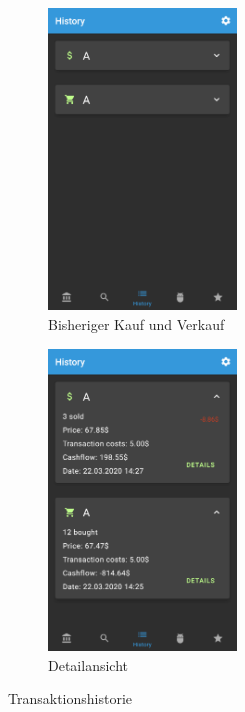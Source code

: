 \documentclass[a4paper]{article}
\begin{document}
\begin{figure}[H]
	\begin{subfigure}{.5\textwidth}
		\centering
		\includegraphics[height=8cm,keepaspectratio]{./images/demo/history_closed.png}
		\caption{Bisheriger Kauf und Verkauf}
		\label{fig:demo:history_closed}
	\end{subfigure}
	\begin{subfigure}{.5\textwidth}
		\centering
		\includegraphics[height=8cm,keepaspectratio]{./images/demo/history_open.png}
		\caption{ Detailansicht}
		\label{fig:demo:history_open}
	\end{subfigure}
	\caption{Transaktionshistorie}
	\label{fig:demo:history}
\end{figure}
\end{document}
